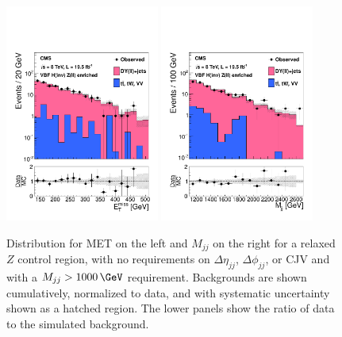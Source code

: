 \begin{figure}[!htb]
\centering
\includegraphics[width=0.45\textwidth]{Chapter05/Images/ZCtrlMET.pdf}
\includegraphics[width=0.45\textwidth]{Chapter05/Images/ZCtrlMjj.pdf}   
\caption{Distribution for \gls{MET} on the left and $M_{jj}$ on the right for a relaxed $Z$ control region, with no requirements on $\Delta\eta_{jj}$, $\Delta\phi_{jj}$, or \gls{CJV} and with a $M_{jj}>1000\,\GeV$ requirement. Backgrounds are shown cumulatively, normalized to data, and with systematic uncertainty shown as a hatched region. The lower panels show the ratio of data to the simulated background. \cite{ARTICLE:CMSVBFHiggsToInvAndZHCombination}}
\label{FIGURE:PromptDataAnalysis_BackgroundEstimation_ZControlRegion}
\end{figure}

